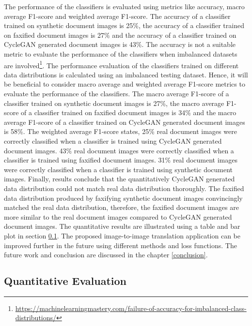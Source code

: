 The performance of the classifiers is evaluated using metrics like accuracy, macro average F1-score and weighted average F1-score. The accuracy of a classifier trained on synthetic document images is 25\%, the accuracy of a classifier trained on faxified document images is 27\% and the accuracy of a classifier trained on \ac{CycleGAN} generated document images is 43\%. The accuracy is not a suitable metric to evaluate the performance of the classifiers when imbalanced datasets are involved\footnote{\url{https://machinelearningmastery.com/failure-of-accuracy-for-imbalanced-class-distributions/} \dcdate}. The performance evaluation of the classifiers trained on different data distributions is calculated using an imbalanced testing dataset. Hence, it will be beneficial to consider macro average and weighted average F1-score metrics to evaluate the performance of the classifiers. The macro average F1-score of a classifier trained on synthetic document images is 27\%, the macro average F1-score of a classifier trained on faxified document images is 34\% and the macro average F1-score of a classifier trained on \ac{CycleGAN} generated document images is 58\%. The weighted average F1-score states, 25\% real document images were correctly classified when a classifier is trained using \ac{CycleGAN} generated document images. 43\% real document images were correctly classified when a classifier is trained using faxified document images. 31\% real document images were correctly classified when a classifier is trained using synthetic document images. Finally, results conclude that the quantitatively \ac{CycleGAN} generated data distribution could not match real data distribution thoroughly. The faxified data distribution produced by faxifying synthetic document images convincingly matched the real data distribution, therefore, the faxified document images are more similar to the real document images compared to \ac{CycleGAN} generated document images. The quantitative results are illustrated using a table and bar plot in section \ref{QuantitativeResults}. The proposed image-to-image translation application can be improved further in the future using different methods and loss functions. The future work and conclusion are discussed in the chapter \ref{conclusion}.


\subsection{Quantitative Evaluation}\label{QuantitativeResults}


